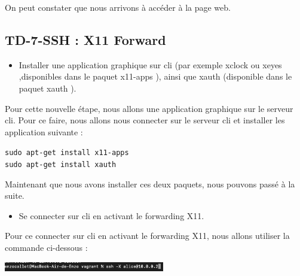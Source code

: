 \documentclass[12pt]{article}
\begin{document}
\vspace{0.3cm}

On peut constater que nous arrivons à accéder à la page web.

\vspace{0.3cm}

\newpage

\subsection{TD-7-SSH : X11 Forward}

\vspace{0.3cm}

\begin{itemize}
  \item Installer une application graphique sur cli (par exemple xclock ou xeyes ,disponibles dans le paquet x11-apps ), ainsi que xauth (disponible dans le paquet xauth ).
\end{itemize}

\vspace{0.3cm}

Pour cette nouvelle étape, nous allons une application graphique sur le serveur cli. Pour ce faire, nous allons nous connecter sur le serveur cli et installer les application suivante : 

\texttt{sudo apt-get install x11-apps} \\
\texttt{sudo apt-get install xauth}

\vspace{0.3cm}

Maintenant que nous avons installer ces deux paquets, nous pouvons passé à la suite.

\vspace{0.3cm}

\begin{itemize}
  \item Se connecter sur cli en activant le forwarding X11.
\end{itemize}

\vspace{0.3cm}

Pour ce connecter sur cli en activant le forwarding X11, nous allons utiliser la commande ci-dessous : 

\vspace{0.3cm}

\begin{center}
  \includegraphics[width=7cm]{Image-TD-SSH-7/SSH-Forwarding-X11.png}
\end{center}
\end{document}
